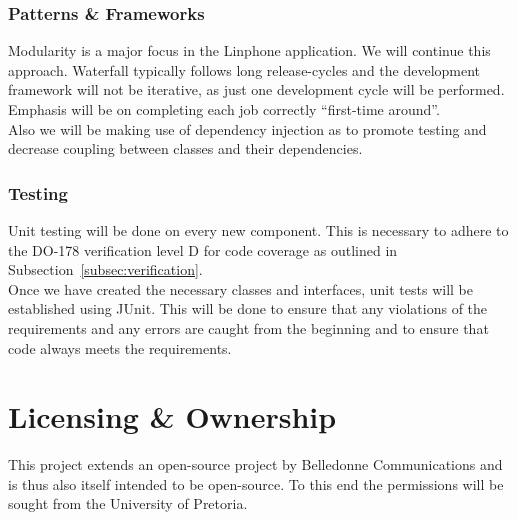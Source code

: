 \documentclass[11pt]{article}
\begin{document}
\subsubsection{Patterns \& Frameworks}
Modularity is a major focus in the Linphone application. We will continue this approach. Waterfall typically follows long release-cycles and the development framework will not be iterative, as just one development cycle will be performed. Emphasis will be on completing each job correctly \enquote{first-time around}. \\ 
Also we will be making use of dependency injection as to promote testing and decrease coupling between classes and their dependencies.
\subsubsection{Testing}
Unit testing will be done on every new component. This is necessary to adhere to the DO-178 verification level D for code coverage as outlined in Subsection~\ref{subsec:verification}.\\
Once we have created the necessary classes and interfaces, unit tests will be established using JUnit. This will be done to ensure that any violations of the requirements and any errors are caught from the beginning and to ensure that code always meets the requirements.

\section{Licensing \& Ownership}
This project extends an open-source project by Belledonne Communications and is thus also itself intended to be open-source. To this end the permissions will be sought from the University of Pretoria.
\end{document}
